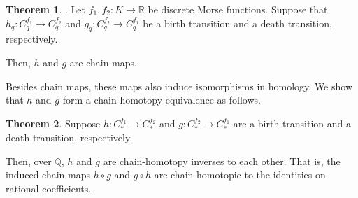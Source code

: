 \documentclass[a4paper,12pt,notitlepage]{amsart}
\theoremstyle{definition}%
\newtheorem{theorem}{Theorem}[section]
\theoremstyle{definition}%
\theoremstyle{definition}%
\newcommand{\R}{\mathbb{R}}
\begin{document}
\begin{theorem}\cite[Theorem 4.1]{no.2}.
Let $f_1, f_2:K \to \R$ 
be discrete Morse functions.
Suppose that 
$h_q:C_q^{f_1} \to C_q^{f_2}$ and $g_q:C_q^{f_2} \to C_q^{f_1}$ be a birth transition and 
a death transition, 
respectively.

Then, 
$h$ and $g$ are chain maps.
\end{theorem}


Besides chain maps,
these maps 
also   induce isomorphisms in homology. 
We show that $h$ and $g$ form a 
chain-homotopy equivalence as follows.
\begin{theorem}

Suppose $h:C_\ast^{f_1} \to C_\ast^{f_2}$ and 
$g:C_\ast^{f_2} \to C_\ast^{f_1}$ are a birth transition and 
a death transition, respectively. 

Then, over $\mathbb{Q}$, 
$h$ and $g$ are chain-homotopy inverses to each other. 
That is, the induced chain maps
$h\circ g$ and  $g\circ h$
are chain homotopic to the
identities on rational coefficients.

\end{theorem}
\end{document}
